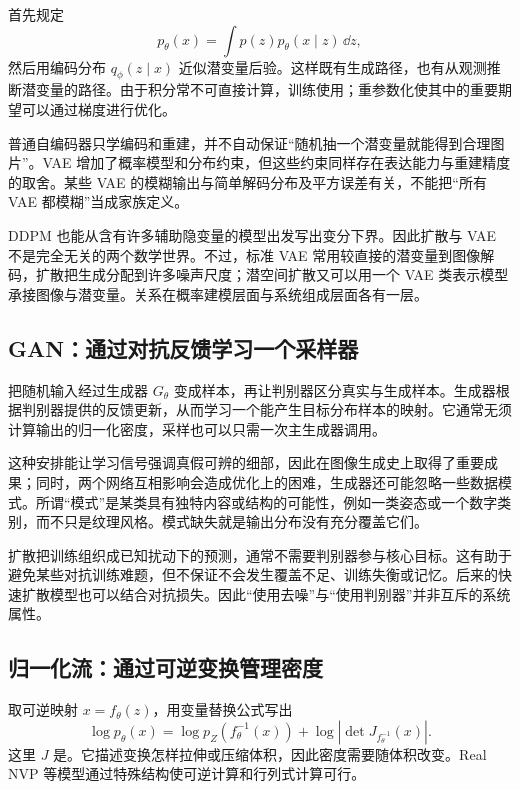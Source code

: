 首先规定
\[
 p_\theta(x)=\int p(z)p_\theta(x\mid z)\,\dd z,
\]
然后用编码分布 $q_\phi(z\mid x)$ 近似潜变量后验。这样既有生成路径，也有从观测推断潜变量的路径。由于积分常不可直接计算，训练使用；重参数化使其中的重要期望可以通过梯度进行优化。\cite{c_kingma2014vae}

普通自编码器只学编码和重建，并不自动保证“随机抽一个潜变量就能得到合理图片”。VAE 增加了概率模型和分布约束，但这些约束同样存在表达能力与重建精度的取舍。某些 VAE 的模糊输出与简单解码分布及平方误差有关，不能把“所有 VAE 都模糊”当成家族定义。

DDPM 也能从含有许多辅助隐变量的模型出发写出变分下界。因此扩散与 VAE 不是完全无关的两个数学世界。不过，标准 VAE 常用较直接的潜变量到图像解码，扩散把生成分配到许多噪声尺度；潜空间扩散又可以用一个 VAE 类表示模型承接图像与潜变量。关系在概率建模层面与系统组成层面各有一层。

\subsection{GAN：通过对抗反馈学习一个采样器}

把随机输入经过生成器 $G_\theta$ 变成样本，再让判别器区分真实与生成样本。生成器根据判别器提供的反馈更新，从而学习一个能产生目标分布样本的映射。\cite{c_goodfellow2014gan}它通常无须计算输出的归一化密度，采样也可以只需一次主生成器调用。

这种安排能让学习信号强调真假可辨的细部，因此在图像生成史上取得了重要成果；同时，两个网络互相影响会造成优化上的困难，生成器还可能忽略一些数据模式。所谓“模式”是某类具有独特内容或结构的可能性，例如一类姿态或一个数字类别，而不只是纹理风格。模式缺失就是输出分布没有充分覆盖它们。

扩散把训练组织成已知扰动下的预测，通常不需要判别器参与核心目标。这有助于避免某些对抗训练难题，但不保证不会发生覆盖不足、训练失衡或记忆。后来的快速扩散模型也可以结合对抗损失。因此“使用去噪”与“使用判别器”并非互斥的系统属性。

\subsection{归一化流：通过可逆变换管理密度}

取可逆映射 $x=f_\theta(z)$，用变量替换公式写出
\[
 \log p_\theta(x)
 =\log p_Z(f_\theta^{-1}(x))
 +\log\left|\det J_{f_\theta^{-1}}(x)\right|.
\]
这里 $J$ 是。它描述变换怎样拉伸或压缩体积，因此密度需要随体积改变。Real NVP 等模型通过特殊结构使可逆计算和行列式计算可行。\cite{c_dinh2017realnvp}

